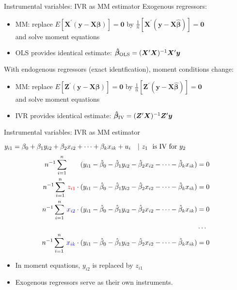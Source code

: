 \documentclass[usenames,dvipsnames]{beamer}
\begin{document}
\begin{frame}{Instrumental variables: IVR as MM estimator}
Exogenous regressors:
\medskip
\begin{itemize}
    \item MM: replace $E[\bm{X}^{\prime}(\bm{y}-\bm{X\beta})]=\bm{0}$ by $\frac{1}{n}[\bm{X}^{\prime}(\bm{y}-\bm{X\hat{\beta}})]=\bm{0}$\\and solve moment equations
    \medskip
    \item OLS provides identical estimate: $\bm{\hat{\beta}}_{\textnormal{OLS}} = (\bm{X}^{\prime}\bm{X})^{-1} \bm{X}^{\prime}\bm{y} $
\end{itemize}
\bigskip
With endogenous regressors (exact identfication), moment conditions change:
\medskip
\begin{itemize}
    \item MM: replace $E[\bm{Z}^{\prime}(\bm{y}-\bm{X\beta})]=\bm{0}$ by $\frac{1}{n}[\bm{Z}^{\prime}(\bm{y}-\bm{X\hat{\beta}})]=\bm{0}$\\and solve moment equations
    \medskip
    \item IVR provides identical estimate: $\bm{\hat{\beta}}_{\textnormal{IV}} = (\bm{Z}^{\prime}\bm{X})^{-1} \bm{Z}^{\prime}\bm{y} $
\end{itemize}

\end{frame}
\begin{frame}{Instrumental variables: IVR as MM estimator}

$y_{i1}=\beta_0 + \beta_1 y_{i2} + \beta_2 x_{i2} + \dots + \beta_k x_{ik} + u_{i} \quad|~z_1 \textnormal{~ is IV for } y_2$\\
\begin{align*}
n^{-1} \sum_{i=1}^n ~~~~~~(y_{i1}-\hat{\beta}_0-\hat{\beta}_1 y_{i2}-\hat{\beta}_2 x_{i2}- \dots- \hat{\beta}_k x_{ik})&=0 \\
n^{-1} \sum_{i=1}^n \, \textcolor{red}{z_{i1}} \cdot (y_{i1}-\hat{\beta}_0-\hat{\beta}_1 y_{i2}-\hat{\beta}_2 x_{i2}- \dots- \hat{\beta}_k x_{ik})&=0 \\
n^{-1} \sum_{i=1}^n \, \textcolor{blue}{x_{i2}} \cdot (y_{i1}-\hat{\beta}_0-\hat{\beta}_1 y_{i2}-\hat{\beta}_2 x_{i2}- \dots- \hat{\beta}_k x_{ik})&=0 \\
       & \dots \\
n^{-1} \sum_{i=1}^n \, \textcolor{blue}{x_{ik}} \cdot (y_{i1}-\hat{\beta}_0-\hat{\beta}_1 y_{i2}-\hat{\beta}_2 x_{i2}- \dots- \hat{\beta}_k x_{ik})&=0
\end{align*} 
\vspace{-0.5cm}
\begin{itemize}
    \item In moment equations, $y_{i2}$ is replaced by $z_{i1}$
    \item Exogenous regressors serve as their own instruments.
\end{itemize}
\end{frame}
\end{document}
